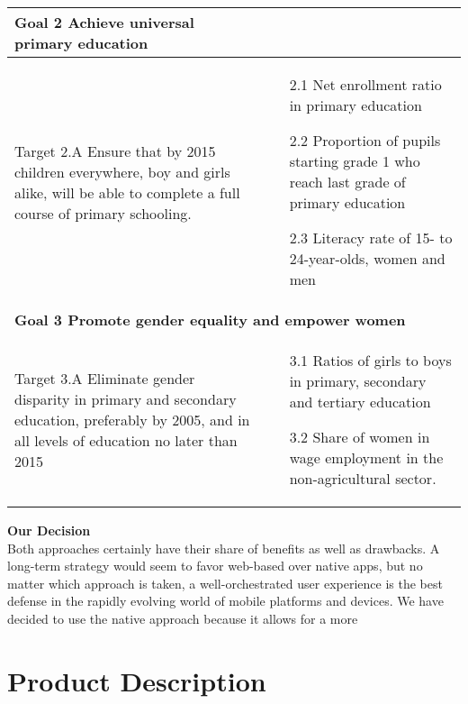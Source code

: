 \begin{center}
\begin{tabularx}{\textwidth}[t]{XX}
\arrayrulecolor{green}\hline
\textbf{\textcolor{myGreen}{Goal 2 Achieve universal primary education}} \\
\hline

Target 2.A Ensure that by 2015 children everywhere, boy and girls alike, will be able to complete a full course of primary schooling. &
\begin{minipage}[t]{\linewidth}%
\begin{itemize}
\item[2.1] Net enrollment ratio in primary education
\item[2.2] Proportion of pupils starting grade 1 who reach last grade of primary education
\item[2.3] Literacy rate of 15- to 24-year-olds, women and men
\end{itemize}
\end{minipage}\\

\hline
\multicolumn{2}{l}{%
\textbf{\textcolor{myGreen}{Goal 3 Promote gender equality and empower women}}} \\
\hline

Target 3.A Eliminate gender disparity in primary and secondary education, preferably by 2005, and in all levels of education no later than 2015 &
\begin{minipage}[t]{\linewidth}%
\begin{itemize}
\item[3.1] Ratios of girls to boys in primary, secondary and tertiary education
\item[3.2] Share of women in wage employment in the non-agricultural sector.
\end{itemize} 
\end{minipage}
\end{tabularx}
\end{center}


\textbf{Our Decision} \\

Both approaches certainly have their share of benefits as well as drawbacks. A long-term strategy would seem to favor web-based over native apps, but no matter which approach is taken, a well-orchestrated user experience is the best defense in the rapidly evolving world of mobile platforms and devices. We have decided to use the native approach because it allows for a more 

\section{Product Description}

